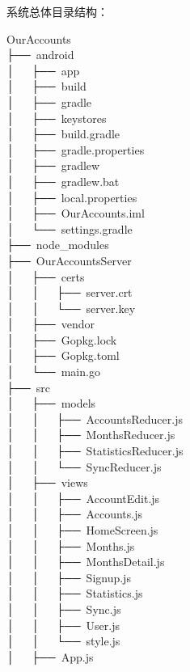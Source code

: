 \documentclass{article}
\begin{document}
\noindent{}系统总体目录结构：%
\begin{mdpre}%
\noindent OurAccounts\\
├──~android\\
│~~~├──~app\\
│~~~├──~build\\
│~~~├──~gradle\\
│~~~├──~keystores\\
│~~~├──~build.gradle\\
│~~~├──~gradle.properties\\
│~~~├──~gradlew\\
│~~~├──~gradlew.bat\\
│~~~├──~local.properties\\
│~~~├──~OurAccounts.iml\\
│~~~└──~settings.gradle\\
├──~node\_modules\\
├──~OurAccountsServer\\
│  ~├──~certs\\
│  ~│  ~├──~server.crt\\
│  ~│  ~└──~server.key\\
│  ~├──~vendor\\
│  ~├──~Gopkg.lock\\
│  ~├──~Gopkg.toml\\
│  ~└──~main.go\\
├──~src\\
│  ~├──~models\\
│  ~│  ~├──~AccountsReducer.js\\
│  ~│  ~├──~MonthsReducer.js\\
│  ~│  ~├──~StatisticsReducer.js\\
│  ~│  ~└──~SyncReducer.js\\
│  ~├──~views\\
│  ~│  ~├──~AccountEdit.js\\
│  ~│  ~├──~Accounts.js\\
│  ~│  ~├──~HomeScreen.js\\
│  ~│  ~├──~Months.js\\
│  ~│  ~├──~MonthsDetail.js\\
│  ~│  ~├──~Signup.js\\
│  ~│  ~├──~Statistics.js\\
│  ~│  ~├──~Sync.js\\
│  ~│  ~├──~User.js\\
│  ~│  ~└──~style.js\\
│  ~├──~App.js\\

\end{mdpre}
\end{document}
